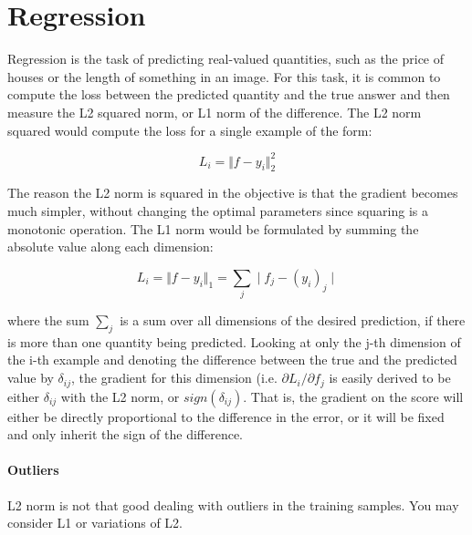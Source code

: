 \section*{Regression}
Regression is the task of predicting real-valued quantities, such as the price of houses or the length of something in an image. For this task, it is common to compute the loss between the predicted quantity and the true answer and then measure the L2 squared norm, or L1 norm of the difference. The L2 norm squared would compute the loss for a single example of the form:

\begin{equation}
L_i = \Vert f - y_i \Vert_2^2
\end{equation}

The reason the L2 norm is squared in the objective is that the gradient becomes much simpler, without changing the optimal parameters since squaring is a monotonic operation. The L1 norm would be formulated by summing the absolute value along each dimension:

\begin{equation}
L_i = \Vert f - y_i \Vert_1 = \sum_j \mid f_j - (y_i)_j \mid
\end{equation}

where the sum $\sum_j$ is a sum over all dimensions of the desired prediction, if there is more than one quantity being predicted. Looking at only the j-th dimension of the i-th example and denoting the difference between the true and the predicted value by $\delta_{ij}$, the gradient for this dimension (i.e. $\partial{L_i} / \partial{f_j}$ is easily derived to be either $\delta_{ij}$ with the L2 norm, or $sign(\delta_{ij})$. That is, the gradient on the score will either be directly proportional to the difference in the error, or it will be fixed and only inherit the sign of the difference.

\paragraph*{Outliers} L2 norm is not that good dealing with outliers in the training samples. You may consider L1 or variations of L2.

